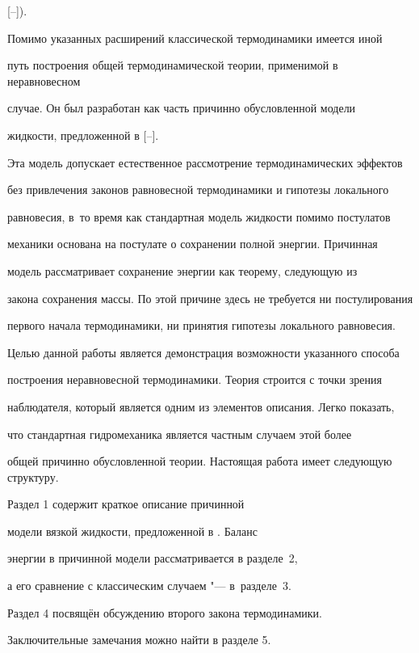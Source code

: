 [--]). 



Помимо указанных расширений классической термодинамики имеется \linebreak иной

путь построения общей термодинамической теории, применимой в неравновесном

случае. Он был разработан как часть причинно обусловленной модели

жидкости, предложенной в [--].

Эта модель допускает естественное рассмотрение термодинамических эффектов

без привлечения законов равновесной термодинамики и гипотезы локального

равновесия, в~то время как стандартная модель жидкости помимо постулатов

механики основана на постулате о сохранении полной энергии. Причинная

модель рассматривает сохранение энергии как теорему, следующую из

закона сохранения массы. По этой причине здесь не требуется ни постулирования

первого начала термодинамики, ни принятия гипотезы локального равновесия.



Целью данной работы является демонстрация возможности указанного способа

построения неравновесной термодинамики. Теория строится с точки зрения

наблюдателя, который является одним из элементов описания. Легко показать,

что стандартная гидромеханика является частным случаем этой более

общей причинно обусловленной теории. Настоящая работа имеет следующую структуру.

Раздел 1 содержит краткое описание причинной

модели вязкой жидкости, предложенной в \cite{Belevich03}. Баланс

энергии в причинной модели рассматривается в разделе~2,

а его сравнение с классическим случаем "---  в~разделе~3.

Раздел 4 посвящён обсуждению второго закона термодинамики.

Заключительные замечания можно найти в разделе 5.



